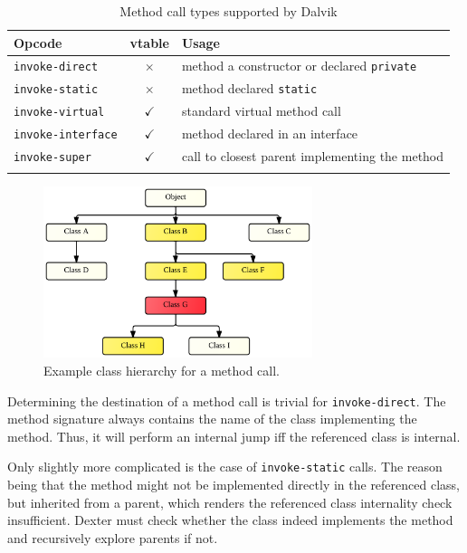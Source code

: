 \documentclass[12pt,twoside,notitlepage]{report}
\newcommand{\tick}{$\checkmark$}
\newcommand{\cross}{$\times$}
\begin{document}
\begin{table}[h]
	\begin{center}
	\begin{tabular}{|l|c|l|}
		\firsthline
		\textbf{Opcode}         & \footnotesize{\textbf{vtable}} & \textbf{Usage} \\
		\hline
		\verb$invoke-direct$    & \cross          & method a constructor or declared \verb$private$ \\
		\verb$invoke-static$    & \cross          & method declared \verb$static$ \\
		\hline
		\verb$invoke-virtual$   & \tick           & standard virtual method call \\
		\verb$invoke-interface$ & \tick           & method declared in an interface \\
		\verb$invoke-super$     & \tick           & call to closest parent implementing the method \\
		\lasthline
	\end{tabular}
	\end{center}
	\caption{Method call types supported by Dalvik}
	\label{table:TaintPropagation_MethodCallTypes}
\end{table}

\begin{figure}
	\centerline{	
		\includegraphics[width=0.7\textwidth]{figs/fig_virtual_call_tree.png}
	}
	\caption{Example class hierarchy for a method call.}
	\label{fig:TaintPropagation_DestDecision_ClassHierarchy}
\end{figure}

Determining the destination of a method call is trivial for \verb$invoke-direct$. The method signature always contains the name of the class implementing the method. Thus, it will perform an internal jump iff the referenced class is internal.

Only slightly more complicated is the case of \verb$invoke-static$ calls. The reason being that the method might not be implemented directly in the referenced class, but inherited from a parent, which renders the referenced class internality check insufficient. Dexter must check whether the class indeed implements the method and recursively explore parents if not.
\end{document}
